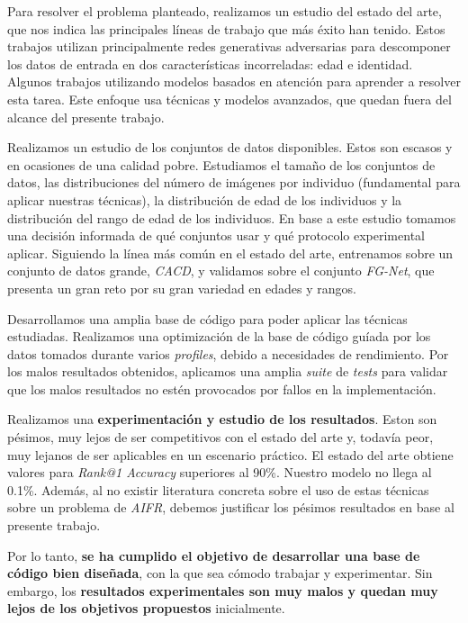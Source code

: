 Para resolver el problema planteado, realizamos un estudio del estado del arte, que nos indica las principales líneas de trabajo que más éxito han tenido. Estos trabajos utilizan principalmente redes generativas adversarias para descomponer los datos de entrada en dos características incorreladas: edad e identidad. Algunos trabajos utilizando modelos basados en atención para aprender a resolver esta tarea. Este enfoque usa técnicas y modelos avanzados, que quedan fuera del alcance del presente trabajo.

Realizamos un estudio de los conjuntos de datos disponibles. Estos son escasos y en ocasiones de una calidad pobre. Estudiamos el tamaño de los conjuntos de datos, las distribuciones del número de imágenes por individuo (fundamental para aplicar nuestras técnicas), la distribución de edad de los individuos y la distribución del rango de edad de los individuos. En base a este estudio tomamos una decisión informada de qué conjuntos usar y qué protocolo experimental aplicar. Siguiendo la línea más común en el estado del arte, entrenamos sobre un conjunto de datos grande, \textit{CACD}, y validamos sobre el conjunto \textit{FG-Net}, que presenta un gran reto por su gran variedad en edades y rangos.

Desarrollamos una amplia base de código para poder aplicar las técnicas estudiadas. Realizamos una optimización de la base de código guíada por los datos tomados durante varios \textit{profiles}, debido a necesidades de rendimiento. Por los malos resultados obtenidos, aplicamos una amplia \textit{suite} de \textit{tests} para validar que los malos resultados no estén provocados por fallos en la implementación.

Realizamos una \textbf{experimentación y estudio de los resultados}. Eston son pésimos, muy lejos de ser competitivos con el estado del arte y, todavía peor, muy lejanos de ser aplicables en un escenario práctico. El estado del arte obtiene valores para \textit{Rank@1 Accuracy} superiores al 90\%. Nuestro modelo no llega al 0.1\%. Además, al no existir literatura concreta sobre el uso de estas técnicas sobre un problema de \textit{AIFR}, debemos justificar los pésimos resultados en base al presente trabajo.

Por lo tanto, \textbf{se ha cumplido el objetivo de desarrollar una base de código bien diseñada}, con la que sea cómodo trabajar y experimentar. Sin embargo, los \textbf{resultados experimentales son muy malos y quedan muy lejos de los objetivos propuestos} inicialmente.

\endinput
